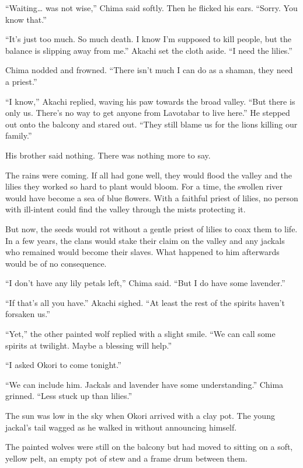 ``Waiting\ldots{} was not wise,'' Chima said softly. Then he flicked his ears. ``Sorry. You know that.''

``It's just too much. So much death. I know I'm supposed to kill people, but the balance is slipping away from me.'' Akachi set the cloth aside. ``I need the lilies.''

Chima nodded and frowned. ``There isn't much I can do as a shaman, they need a priest.''

``I know,'' Akachi replied, waving his paw towards the broad valley. ``But there is only us. There's no way to get anyone from Lavotabar to live here.'' He stepped out onto the balcony and stared out. ``They still blame us for the lions killing our family.''

His brother said nothing. There was nothing more to say.

The rains were coming. If all had gone well, they would flood the valley and the lilies they worked so hard to plant would bloom. For a time, the swollen river would have become a sea of blue flowers. With a faithful priest of lilies, no person with ill-intent could find the valley through the mists protecting it. 

But now, the seeds would rot without a gentle priest of lilies to coax them to life. In a few years, the clans would stake their claim on the valley and any jackals who remained would become their slaves. What happened to him afterwards would be of no consequence.

``I don't have any lily petals left,'' Chima said. ``But I do have some lavender.''

``If that's all you have.'' Akachi sighed. ``At least the rest of the spirits haven't forsaken us.''

``Yet,'' the other painted wolf replied with a slight smile. ``We can call some spirits at twilight. Maybe a blessing will help.''

``I asked Okori to come tonight.''

``We can include him. Jackals and lavender have some understanding.'' Chima grinned. ``Less stuck up than lilies.''

\secdiv

\noindent The sun was low in the sky when Okori arrived with a clay pot. The young jackal's tail wagged as he walked in without announcing himself. 

The painted wolves were still on the balcony but had moved to sitting on a soft, yellow pelt, an empty pot of stew and a frame drum between them.

